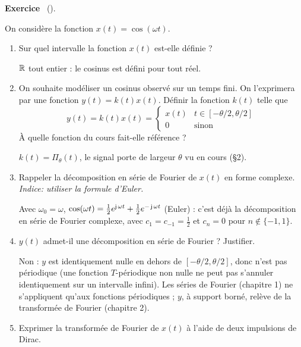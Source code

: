 \documentclass[a4paper,11pt]{article}
\theoremstyle{definition}
\newcounter{exercice}   %
\newenvironment{exercice}[1][]{%
  \refstepcounter{exercice}%
  \par\noindent\textbf{Exercice \theexercice}\if\relax\detokenize{#1}\relax\else\ (#1)\fi.\par\noindent\ignorespaces
}{\par}
\begin{document}
\begin{exercice}
    On considère la fonction $x(t) = \cos(\omega t)$.

    \begin{enumerate}[\bfseries 1.]
        \item Sur quel intervalle la fonction $x(t)$ est-elle définie ?
        \begin{solution}
            ${\mathbb{R}}$ tout entier : le cosinus est défini pour tout réel.
        \end{solution}
        \item On souhaite modéliser un cosinus observé sur un temps fini. On l'exprimera par une fonction $y(t) = k(t)x(t)$. Définir la fonction $k(t)$ telle que
        $$
            y(t) = k(t)x(t) = \begin{cases}
                x(t) & t\in[-\theta/2, \theta/2] \\
                0 & \text{sinon}
            \end{cases}
        $$
        À quelle fonction du cours fait-elle référence ?
        \begin{solution}
            $k(t) = \Pi_\theta(t)$, le signal porte de largeur $\theta$ vu en cours (\S2).
        \end{solution}
        \item Rappeler la décomposition en série de Fourier de $x(t)$ en forme complexe. \textit{Indice: utiliser la formule d'Euler.}
        \begin{solution}
            Avec $\omega_0=\omega$, $\cos(\omega t) = \frac12e^{\operatorname{\mathsf{j}}\omega t}+\frac12e^{-\operatorname{\mathsf{j}}\omega t}$ (Euler) : c'est déjà la décomposition en série de Fourier complexe, avec $c_1=c_{-1}=\frac12$ et $c_n=0$ pour $n\notin\{-1,1\}$.
        \end{solution}
        \item $y(t)$ admet-il une décomposition en série de Fourier ? Justifier.
        \begin{solution}
            Non : $y$ est identiquement nulle en dehors de $[-\theta/2,\theta/2]$, donc n'est pas périodique (une fonction $T$-périodique non nulle ne peut pas s'annuler identiquement sur un intervalle infini). Les séries de Fourier (chapitre 1) ne s'appliquent qu'aux fonctions périodiques ; $y$, à support borné, relève de la transformée de Fourier (chapitre 2).
        \end{solution}
        \item Exprimer la transformée de Fourier de $x(t)$ à l'aide de deux impulsions de Dirac.


\end{enumerate}
\end{exercice}
\end{document}
